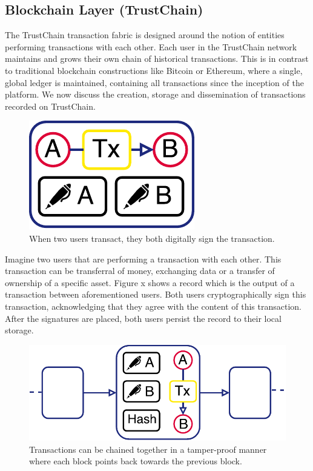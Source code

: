 \documentclass[USenglish]{article}
\begin{document}
\subsection{Blockchain Layer (TrustChain)}

The TrustChain transaction fabric is designed around the notion of entities performing transactions with each other.
Each user in the TrustChain network maintains and grows their own chain of historical transactions. 
This is in contrast to traditional blockchain constructions like Bitcoin or Ethereum, where a single, global ledger is maintained, containing all transactions since the inception of the platform.
We now discuss the creation, storage and dissemination of transactions recorded on TrustChain.

\begin{figure}[h!]
	\centering
	\includegraphics[width=0.5\columnwidth]{assets/trustchain_tutorial_1}
	\caption{When two users transact, they both digitally sign the transaction.}
	\label{fig:trustchain_tutorial_1}
\end{figure}

Imagine two users that are performing a transaction with each other.
This transaction can be transferral of money, exchanging data or a transfer of ownership of a specific asset.
Figure x shows a record which is the output of a transaction between aforementioned users.
Both users cryptographically sign this transaction, acknowledging that they agree with the content of this transaction.
After the signatures are placed, both users persist the record to their local storage.

\begin{figure}[h!]
	\centering
	\includegraphics[width=0.5\columnwidth]{assets/trustchain_tutorial_2}
	\caption{Transactions can be chained together in a tamper-proof manner where each block points back towards the previous block.}
	\label{fig:trustchain_tutorial_2}
\end{figure}
\end{document}
